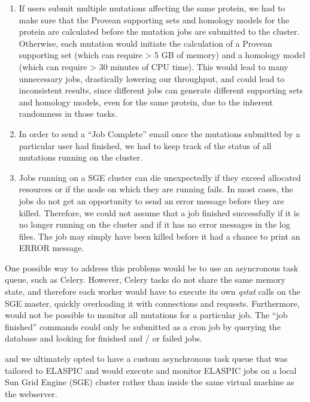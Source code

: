 \begin{enumerate}

	\item If users submit multiple mutations affecting the same protein, we had to make sure that the Provean supporting sets and homology models for the protein are calculated before the mutation jobs are submitted to the cluster. Otherwise, each mutation would initiate the calculation of a Provean supporting set (which can require > 5 GB of memory) and a homology model (which can require > 30 minutes of CPU time). This would lead to many unnecessary jobs, drastically lowering our throughput, and could lead to inconsistent results, since different jobs can generate different supporting sets and homology models, even for the same protein, due to the inherent randomness in those tasks.

	\item In order to send a ``Job Complete'' email once the mutations submitted by a particular user had finished, we had to keep track of the status of all mutations running on the cluster.

	\item Jobs running on a SGE cluster can die unexpectedly if they exceed allocated resources or if the node on which they are running fails. In most cases, the jobs do not get an opportunity to send an error message before they are killed. Therefore, we could not assume that a job finished successfully if it is no longer running on the cluster and if it has no error messages in the log files. The job may simply have been killed before it had a chance to print an ERROR message.

\end{enumerate}

One possible way to address this problems would be to use an asyncronous task queue, such as Celery. However, Celery tasks do not share the same memory state, and therefore each worker would have to execute its own \textit{qstat} calls on the SGE master, quickly overloading it with connections and requests. Furthermore,  would not be possible to monitor all mutations for a particular job. The ``job finished'' commands could only be submitted as a cron job by querying the database and looking for finished and / or failed jobs.

and we ultimately opted to have a custom asynchronous task queue that was tailored to ELASPIC and would execute and monitor ELASPIC jobs on a local Sun Grid Engine (SGE) cluster rather than inside the same virtual machine as the webserver.


